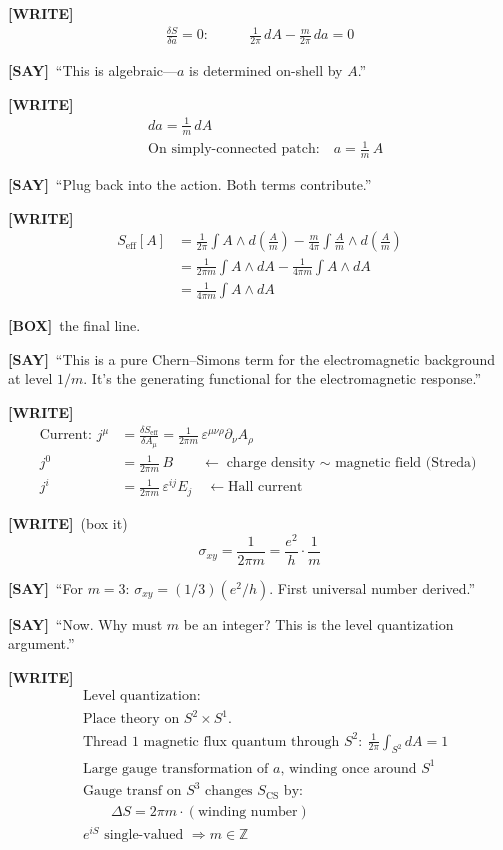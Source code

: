 \documentclass[11pt]{article}
\newcommand{\WRITE}{\textcolor{writecol}{\textbf{[WRITE]}}}
\newcommand{\SAY}{\textcolor{saycol}{\textbf{[SAY]}}}
\newcommand{\BOX}{\textcolor{boxcol}{\textbf{[BOX]}}}
\begin{document}
\WRITE
\begin{align*}
\frac{\delta S}{\delta a} = 0: \qquad &\frac{1}{2\pi}\,dA - \frac{m}{2\pi}\,da = 0
\end{align*}

\SAY\ ``This is algebraic---$a$ is determined on-shell by $A$.''

\WRITE
\begin{align*}
&da = \frac{1}{m}\,dA\\[4pt]
&\text{On simply-connected patch:}\quad a = \frac{1}{m}\,A
\end{align*}

\SAY\ ``Plug back into the action. Both terms contribute.''

\WRITE
\begin{align*}
S_{\mathrm{eff}}[A] &= \frac{1}{2\pi}\int A\wedge d\!\left(\frac{A}{m}\right) - \frac{m}{4\pi}\int \frac{A}{m}\wedge d\!\left(\frac{A}{m}\right)\\[4pt]
&= \frac{1}{2\pi m}\int A\wedge dA - \frac{1}{4\pi m}\int A\wedge dA\\[4pt]
&= \frac{1}{4\pi m}\int A\wedge dA
\end{align*}

\BOX\ the final line.

\SAY\ ``This is a pure Chern--Simons term for the electromagnetic background at level $1/m$. It's the generating functional for the electromagnetic response.''

\WRITE
\begin{align*}
\text{Current: } j^\mu &= \frac{\delta S_{\mathrm{eff}}}{\delta A_\mu} = \frac{1}{2\pi m}\,\varepsilon^{\mu\nu\rho}\partial_\nu A_\rho\\[6pt]
j^0 &= \frac{1}{2\pi m}\,B \qquad\leftarrow\text{charge density $\sim$ magnetic field (Streda)}\\[4pt]
j^i &= \frac{1}{2\pi m}\,\varepsilon^{ij}E_j \quad\leftarrow\text{Hall current}
\end{align*}

\WRITE\ {\large (box it)}
\begin{equation*}
\boxed{\sigma_{xy} = \frac{1}{2\pi m} = \frac{e^2}{h}\cdot\frac{1}{m}}
\end{equation*}

\SAY\ ``For $m=3$: $\sigma_{xy} = (1/3)(e^2/h)$. First universal number derived.''

\SAY\ ``Now. Why must $m$ be an integer? This is the level quantization argument.''

\WRITE
\begin{align*}
&\text{Level quantization:}\\[4pt]
&\text{Place theory on } S^2\!\times S^1.\\
&\text{Thread 1 magnetic flux quantum through }S^2:\ \frac{1}{2\pi}\!\int_{S^2}\! dA = 1\\[4pt]
&\text{Large gauge transformation of }a\text{, winding once around }S^1\\[4pt]
&\text{Gauge transf on }S^3\text{ changes }S_{\mathrm{CS}}\text{ by:}\\
&\qquad\Delta S = 2\pi m\cdot(\text{winding number})\\[4pt]
&e^{iS}\text{ single-valued } \Rightarrow m\in\mathbb{Z}
\end{align*}
\end{document}

